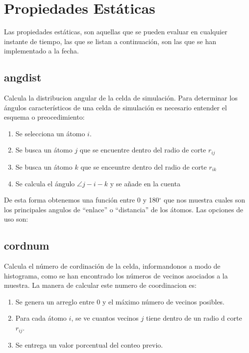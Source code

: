 \section{Propiedades Est\'aticas}
Las propiedades est\'aticas, son aquellas que se pueden evaluar en cualquier instante de tiempo, las que se listan a continuaci\'on, son las que se han implementado a la fecha.
\subsection{angdist}
Calcula la distribucion angular de la celda de simulaci\'on. Para determinar los \'angulos caracter\'isticos de una celda de simulaci\'on es necesario entender el esquema o preocedimiento:
\begin{enumerate}
 \item Se selecciona un \'atomo $i$.
 \item Se busca un \'atomo $j$ que se encuentre dentro del radio de corte $r_{ij}$
 \item Se busca un \'atomo $k$ que se enceuntre dentro del radio de corte $r_{ik}$
 \item Se calcula el \'angulo  $\angle j-i-k$ y se a\~nade en la cuenta
\end{enumerate}

De esta forma obtenemos una funci\'on entre 0 y 180$^\circ$ que nos muestra cuales son los principales angulos de ``enlace'' o ``distancia'' de los \'atomos. Las opciones de uso son:


\subsection{cordnum}
Calcula el n\'umero de cordinaci\'on de la celda, informandonos a modo de histograma, como se han encontrado los n\'umeros de vecinos asociados a la muestra. La manera de calcular este numero de coordinacion es:
\begin{enumerate}
 \item Se genera un arreglo entre 0 y el m\'aximo n\'umero de vecinos posibles.
 \item Para cada \'atomo $i$, se ve cuantos vecinos $j$ tiene dentro de un radio d corte $r_{ij}$.
 \item Se entrega un valor porcentual del conteo previo.
\end{enumerate}

